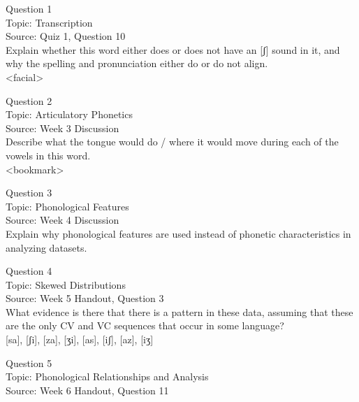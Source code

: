 \documentclass[12pt]{article}
\begin{document}
{\large Question 1}\\

Topic: Transcription\\
Source: Quiz 1, Question 10\\

Explain whether this word either does or does not have an [ʃ] sound in it, and why the spelling and pronunciation either do or do not align.\\

<facial>


\newpage

{\large Question 2}\\

Topic: Articulatory Phonetics\\
Source: Week 3 Discussion\\

Describe what the tongue would do / where it would move during each of the vowels in this word.\\

<bookmark>


\newpage

{\large Question 3}\\

Topic: Phonological Features\\
Source: Week 4 Discussion\\

Explain why phonological features are used instead of phonetic characteristics in analyzing datasets.\\


\newpage

{\large Question 4}\\

Topic: Skewed Distributions\\
Source: Week 5 Handout, Question 3\\

What evidence is there that there is a pattern in these data, assuming that these are the only CV and VC sequences that occur in some language?\\

{[sa]}, {[ʃi]}, {[za]}, {[ʒi]}, {[as]}, {[iʃ]}, {[az]}, {[iʒ]}


\newpage

{\large Question 5}\\

Topic: Phonological Relationships and Analysis\\
Source: Week 6 Handout, Question 11\\
\end{document}
